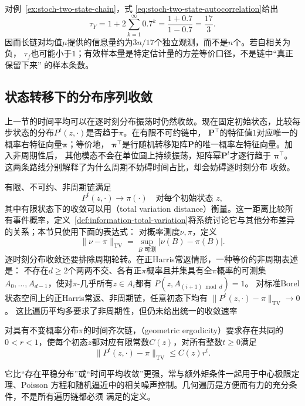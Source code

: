 对例~\ref{ex:stoch-two-state-chain}，式
\eqref{eq:stoch-two-state-autocorrelation}给出
\[
  \tau_Y=1+2\sum_{k=1}^{\infty}0.7^k
  =\frac{1+0.7}{1-0.7}=\frac{17}{3}.
\]
因而长链对均值$\mu$提供的信息量约为$3n/17$个独立观测，而不是$n$个。若自相关为负，
$\tau_f$也可能小于$1$；有效样本量是特定估计量的方差等价口径，不是链中“真正保留下来”
的样本条数。

\subsection{状态转移下的分布序列收敛}
\label{sec:rv-state-distribution-limits}
上一节的时间平均可以在逐时刻分布振荡时仍然收敛。现在固定初始状态，比较每步状态的分布\(P^t(z,\cdot)\)是否趋于\(\pi\)。在有限不可约链中，
$\bm{P}^{\top}$的特征值$1$对应唯一的概率右特征向量$\bm{\pi}$；等价地，
$\bm{\pi}^{\top}$是行随机转移矩阵$\bm{P}$的唯一概率左特征向量。加入非周期性后，
其他模态不会在单位圆上持续振荡，矩阵幂$\bm{P}^t$才逐行趋于
$\bm{\pi}^{\top}$。这两条路线分别解释了为什么周期不妨碍时间占比，却会妨碍逐时刻分布
收敛。

有限、不可约、非周期链满足
\begin{equation}
  P^t(z,\cdot)\longrightarrow\pi(\cdot)
  \quad\text{对每个初始状态 }z,
  \label{eq:stoch-finite-chain-distribution-convergence}
\end{equation}
其中有限状态下的收敛可以用（total variation distance）衡量。这一距离比较所有事件概率，定义~\ref{def:information-total-variation}将系统讨论它与其他分布差异的关系；本节只使用下面的表达式：
对概率测度$\nu,\pi$，定义
\[
  \lVert\nu-\pi\rVert_{\mathrm{TV}}
  =
  \sup_{B\text{ 可测}}|\nu(B)-\pi(B)|.
\]
逐时刻分布收敛还要排除周期轮转。在正Harris常返情形，一种等价的非周期表述是：
不存在\(d\geq2\)个两两不交、各有正\(\pi\)概率且并集具有全\(\pi\)概率的可测集
\(A_0,\ldots,A_{d-1}\)，使对\(\pi\)-几乎所有\(z\in A_i\)都有
\(P(z,A_{(i+1)\bmod d})=1\)。
对标准Borel状态空间上的正Harris常返、非周期链，任意初态下均有
\(\|P^t(z,\cdot)-\pi\|_{\mathrm{TV}}\to0\)。
这比遍历平均多要求了非周期性，但仍未给出统一的收敛速率

\begin{definition}[几何遍历性]
  \label{def:stoch-geometric-ergodicity}
  对具有不变概率分布\(\pi\)的时间齐次链，（geometric ergodicity）要求存在共同的$0<r<1$，使每个初态\(z\)都对应有限常数$C(z)$，对所有整数\(t\geq0\)满足
\[
  \lVert P^t(z,\cdot)-\pi\rVert_{\mathrm{TV}}
  \leq C(z)r^t.
\]
\end{definition}
它比“存在平稳分布”或“时间平均收敛”更强，常与额外矩条件一起用于中心极限定理、Poisson
方程和随机逼近中的相关噪声控制。几何遍历是方便而有力的充分条件，不是所有遍历链都必须
满足的定义。

